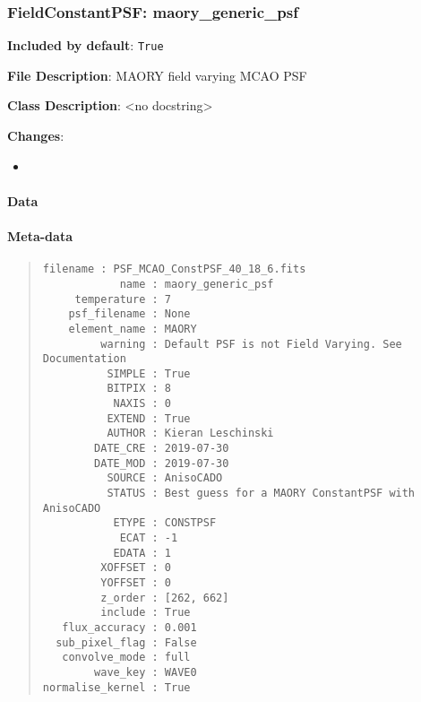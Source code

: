 \subsubsection{FieldConstantPSF: \textquotedbl{}maory\_generic\_psf\textquotedbl{}%
  \label{fieldconstantpsf-maory-generic-psf}%
}

\textbf{Included by default}: \texttt{True}

\textbf{File Description}: MAORY field varying MCAO PSF

\textbf{Class Description}: <no docstring>

\textbf{Changes}:

\begin{itemize}
\item \end{itemize}


\paragraph{Data%
  \label{id1}%
}


\paragraph{Meta-data%
  \label{id2}%
}

\begin{quote}
\begin{alltt}
\begin{lstlisting}[frame=single]
        filename : PSF_MCAO_ConstPSF_40_18_6.fits
            name : maory_generic_psf
     temperature : 7
    psf_filename : None
    element_name : MAORY
         warning : Default PSF is not Field Varying. See Documentation
          SIMPLE : True
          BITPIX : 8
           NAXIS : 0
          EXTEND : True
          AUTHOR : Kieran Leschinski
        DATE_CRE : 2019-07-30
        DATE_MOD : 2019-07-30
          SOURCE : AnisoCADO
          STATUS : Best guess for a MAORY ConstantPSF with AnisoCADO
           ETYPE : CONSTPSF
            ECAT : -1
           EDATA : 1
         XOFFSET : 0
         YOFFSET : 0
         z_order : [262, 662]
         include : True
   flux_accuracy : 0.001
  sub_pixel_flag : False
   convolve_mode : full
        wave_key : WAVE0
normalise_kernel : True
\end{lstlisting}
\end{alltt}
\end{quote}
